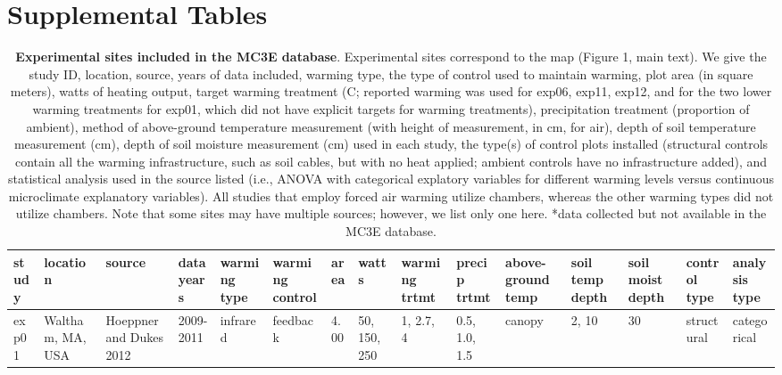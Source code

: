 \documentclass{article}
\begin{document}
\section* {Supplemental Tables} 
\begin{landscape}
\begin{footnotesize} 
\begin{table}[ht]
\centering
\caption{\textbf{Experimental sites included in the MC3E database}. Experimental sites correspond to the map (Figure 1, main text). We give the study ID, location, source, years of data included, warming type, the type of control used to maintain warming, plot area (in square meters), watts of heating output, target warming treatment (\degree C; reported warming was used for exp06, exp11, exp12, and for the two lower warming treatments for exp01, which did not have explicit targets for warming treatments), precipitation treatment (proportion of ambient), method of above-ground temperature measurement (with height of measurement, in cm, for air), depth of soil temperature measurement (cm), depth of soil moisture measurement (cm) used in each study, the type(s) of control plots installed (structural controls contain all the warming infrastructure, such as soil cables, but with no heat applied; ambient controls have no infrastructure added), and statistical analysis used in the source listed (i.e., ANOVA with categorical explatory variables for different warming levels versus continuous microclimate explanatory variables). All studies that employ forced air warming utilize chambers, whereas the other warming types did not utilize chambers. Note that some sites may have multiple sources; however, we list only one here. *data collected but not available in the MC3E database.} 
\label{tab:methods}
\begingroup\footnotesize
\begin{tabular}{|p{}|p{}|p{}|p{}|p{}|p{}|p{}|p{}|p{}|p{}|p{}|p{}|p{}|p{}|p{}|}
  \hline
study & location & source & data years & warming type & warming control & area & watts & warming trtmt & precip trtmt & above-ground temp & soil temp depth & soil moist depth & control type & analysis type \\ 
  \hline
exp01 & Waltham, MA, USA & Hoeppner and Dukes 2012 & 2009-2011 & infrared & feedback & 4.00 & 50, 150, 250 & 1, 2.7, 4 & 0.5, 1.0, 1.5 & canopy & 2, 10 & 30 & structural & categorical \\ 

\end{tabular}
\end{table}
\end{footnotesize}
\end{landscape}
\end{document}
